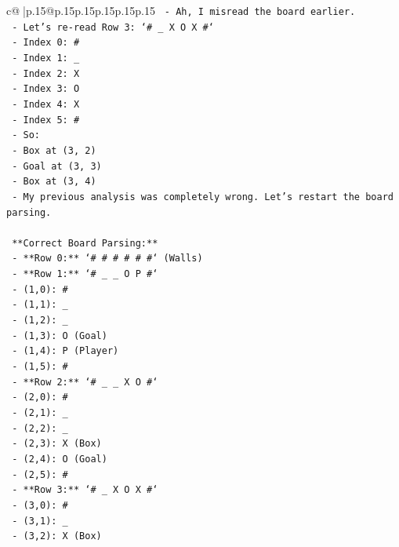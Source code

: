 \documentclass{article}
\begin{document}
{\begin{supertabular}{c@{$\;$}|p{.15\linewidth}@{}p{.15\linewidth}p{.15\linewidth}p{.15\linewidth}p{.15\linewidth}p{.15\linewidth}}
{{{\texttt{    {-} Ah, I misread the board earlier.} \\
\texttt{    {-} Let's re{-}read Row 3: `\# \_ X O X \#`} \\
\texttt{      {-} Index 0: \#} \\
\texttt{      {-} Index 1: \_} \\
\texttt{      {-} Index 2: X} \\
\texttt{      {-} Index 3: O} \\
\texttt{      {-} Index 4: X} \\
\texttt{      {-} Index 5: \#} \\
\texttt{    {-} So:} \\
\texttt{      {-} Box at (3, 2)} \\
\texttt{      {-} Goal at (3, 3)} \\
\texttt{      {-} Box at (3, 4)} \\
\texttt{    {-} My previous analysis was completely wrong. Let's restart the board parsing.} \\
\\ 
\texttt{    **Correct Board Parsing:**} \\
\texttt{    {-} **Row 0:** `\# \# \# \# \# \#` (Walls)} \\
\texttt{    {-} **Row 1:** `\# \_ \_ O P \#`} \\
\texttt{      {-} (1,0): \#} \\
\texttt{      {-} (1,1): \_} \\
\texttt{      {-} (1,2): \_} \\
\texttt{      {-} (1,3): O (Goal)} \\
\texttt{      {-} (1,4): P (Player)} \\
\texttt{      {-} (1,5): \#} \\
\texttt{    {-} **Row 2:** `\# \_ \_ X O \#`} \\
\texttt{      {-} (2,0): \#} \\
\texttt{      {-} (2,1): \_} \\
\texttt{      {-} (2,2): \_} \\
\texttt{      {-} (2,3): X (Box)} \\
\texttt{      {-} (2,4): O (Goal)} \\
\texttt{      {-} (2,5): \#} \\
\texttt{    {-} **Row 3:** `\# \_ X O X \#`} \\
\texttt{      {-} (3,0): \#} \\
\texttt{      {-} (3,1): \_} \\
\texttt{      {-} (3,2): X (Box)} \\
}}}
\end{supertabular}}
\end{document}
